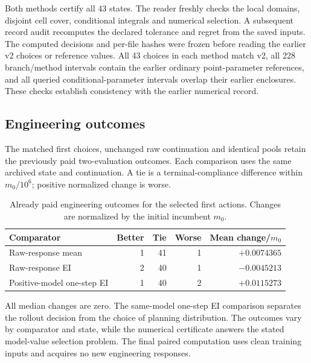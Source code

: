 Both methods certify all 43 states. The reader freshly checks the local domains, disjoint cell cover, conditional integrals and numerical selection. A subsequent record audit recomputes the declared tolerance and regret from the saved inputs. The computed decisions and per-file hashes were frozen before reading the earlier v2 choices or reference values. All 43 choices in each method match v2, all 228 branch/method intervals contain the earlier ordinary point-parameter references, and all queried conditional-parameter intervals overlap their earlier enclosures. These checks establish consistency with the earlier numerical record.

\subsection{Engineering outcomes}

The matched first choices, unchanged raw continuation and identical pools retain the previously paid two-evaluation outcomes. Each comparison uses the same archived state and continuation. A tie is a terminal-compliance difference within $m_0/10^6$; positive normalized change is worse.

\begin{table}[htbp]\centering\small
\caption{Already paid engineering outcomes for the selected first actions. Changes are normalized by the initial incumbent $m_0$.}\label{tab:final_paid}
\begin{tabular}{lrrrr}\toprule
Comparator & Better & Tie & Worse & Mean change/$m_0$\\\midrule
Raw-response mean & 1 & 41 & 1 & $+0.0074365$\\
Raw-response EI & 2 & 40 & 1 & $-0.0045213$\\
Positive-model one-step EI & 1 & 40 & 2 & $+0.0115273$\\
\bottomrule\end{tabular}\end{table}

All median changes are zero. The same-model one-step EI comparison separates the rollout decision from the choice of planning distribution. The outcomes vary by comparator and state, while the numerical certificate answers the stated model-value selection problem. The final paired computation uses clean training inputs and acquires no new engineering responses.
